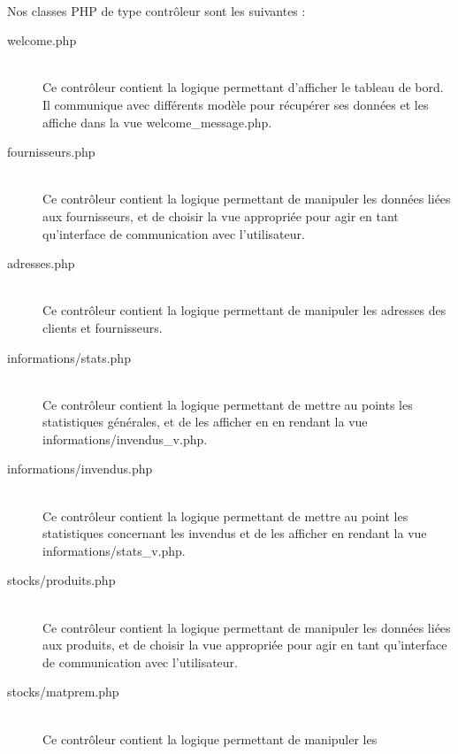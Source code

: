     \paragraph{}
        Nos classes PHP de type contrôleur sont les suivantes :
        \begin{description}
            \item[welcome.php]\hfill \\
                Ce contrôleur contient la logique permettant d'afficher le
                tableau de bord.
                Il communique avec différents modèle pour récupérer ses données
                et les affiche dans la vue welcome\_message.php.
            \item[fournisseurs.php]\hfill \\
                Ce contrôleur contient la logique permettant de manipuler les
                données liées aux fournisseurs, et de choisir la vue
                appropriée pour agir en tant qu'interface de communication 
                avec l'utilisateur.
            \item[adresses.php]\hfill \\
                Ce contrôleur contient la logique permettant de manipuler les
                adresses des clients et fournisseurs.
            \item[informations/stats.php]\hfill \\
                Ce contrôleur contient la logique permettant de mettre au
                points les statistiques générales, et de les afficher en
                en rendant la vue informations/invendus\_v.php.
            \item[informations/invendus.php]\hfill \\
                Ce contrôleur contient la logique permettant de mettre au
                point les statistiques concernant les invendus et de les 
                afficher en rendant la vue informations/stats\_v.php.
            \item[stocks/produits.php]\hfill \\
                Ce contrôleur contient la logique permettant de manipuler les
                données liées aux produits, et de choisir la vue appropriée
                pour agir en tant qu'interface de communication avec
                l'utilisateur.
            \item[stocks/matprem.php]\hfill \\
                Ce contrôleur contient la logique permettant de manipuler les

\end{description}
